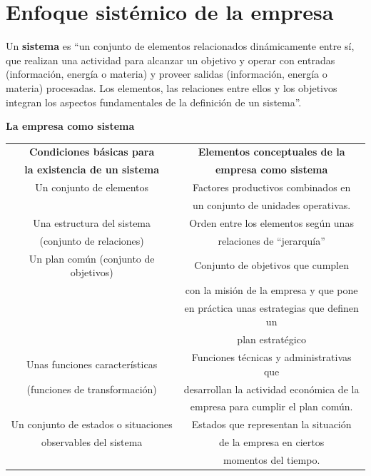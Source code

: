 \documentclass[12pt,a4paper,spanish]{report}
\begin{document}
		\section{\textcolor[rgb]{0.5,0.8,0.9}Enfoque sistémico de la empresa}
			Un \textbf{sistema} es ``un conjunto de elementos relacionados dinámicamente entre sí, que realizan una actividad para alcanzar un objetivo y operar con entradas (información, energía o materia) y proveer salidas (información, energía o materia) procesadas. Los elementos, las relaciones entre ellos y los objetivos integran los aspectos fundamentales de la definición de un sistema''.

			\begin{center}
				\textbf{La empresa como sistema}
				\begin{tabular}{| c | c |}
					\hline
					\rowcolor[rgb]{0.5,0.8,0.9}\textbf{Condiciones básicas para} & \textbf{Elementos conceptuales de la} \\
					\rowcolor[rgb]{0.5,0.8,0.9}\textbf{la existencia de un sistema} & \textbf{empresa como sistema} \\
					\hline
					Un conjunto de elementos & Factores productivos combinados en \\
					& un conjunto de unidades operativas. \\
					\hline
					Una estructura del sistema & Orden entre los elementos según unas \\
					(conjunto de relaciones) & relaciones de ``jerarquía'' \\
					\hline
					Un plan común (conjunto de objetivos) & Conjunto de objetivos que cumplen \\
					& con la misión de la empresa y que pone  \\ 
					& en práctica unas estrategias que definen un \\ 
					& plan estratégico \\
					\hline
					Unas funciones características & Funciones técnicas y administrativas que \\
					(funciones de transformación) & desarrollan la actividad económica de la \\
					& empresa para cumplir el plan común. \\
					\hline
					Un conjunto de estados o situaciones & Estados que representan la situación \\
					observables del sistema & de la empresa en ciertos \\
					& momentos del tiempo. \\
					\hline
				\end{tabular}
			\end{center}
\end{document}
